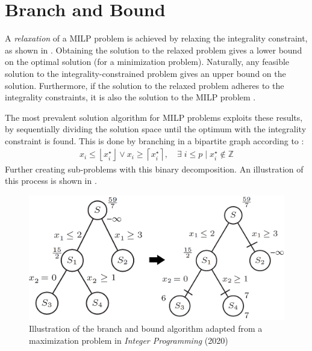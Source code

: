 \section{Branch and Bound}\label{sec:bnb}

A \textit{relaxation} of a \gls{MILP} problem is achieved by relaxing the integrality constraint, as shown in . Obtaining the solution to the relaxed problem gives a lower bound on the optimal solution (for a minimization problem). Naturally, any feasible solution to the integrality-constrained problem gives an upper bound on the solution. Furthermore, if the solution to the relaxed problem adheres to the integrality constraints, it is also the solution to the MILP problem \cite{wolsey2020integer}.

The most prevalent solution algorithm for MILP problems exploits these results, by sequentially dividing the solution space until the optimum with the integrality constraint is found. This is done by branching in a bipartite graph according to \cite{gasse2019exact}:
\begin{align} \label{eq:branch}
    x_{i} \leq\left\lfloor x_{i}^{\star}\right\rfloor \vee x_{i} \geq\left\lceil x_{i}^{\star}\right\rceil, \quad \exists \; i \leq p \mid x_{i}^{\star} \notin \mathbb{Z}    
\end{align}
Further creating sub-problems with this binary decomposition. An illustration of this process is shown in .


\begin{figure}
\centering
\includegraphics[width=0.8\linewidth]{img/bnb.png}
\caption{\label{fig:bandb1}Illustration of the branch and bound algorithm adapted from a maximization problem in \textit{Integer Programming }(2020) \cite{wolsey2020integer}}
\end{figure}

